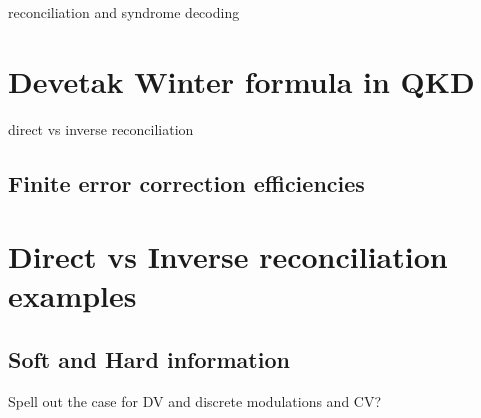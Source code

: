 reconciliation and syndrome decoding

\section{Devetak Winter formula in QKD}
direct vs inverse reconciliation

\subsection{Finite error correction efficiencies}

\section{Direct vs Inverse reconciliation examples}

\subsection{Soft and Hard information}
Spell out the case for DV and discrete modulations and CV?








